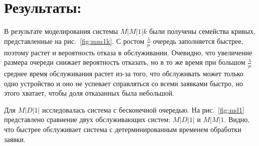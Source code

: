 \documentclass[a4paper,12 pt]{article}
\begin{document}
\section*{Результаты:}
В результате моделирования системы $M|M|1|k$ были получены семейства кривых, представленные на рис.~\ref{fig:mm1k}. С ростом $\frac{\lambda}{\mu}$ очередь заполняется быстрее, поэтому растет и вероятность отказа в обслуживании. Очевидно, что увеличение размера очереди снижает вероятность отказать, но в то же время при большом $\frac{\lambda}{\mu}$ среднее время обслуживания растет из-за того, что обслуживать может только одно устройство и оно не успевает справляться со всеми заявками быстро, но этого хватает, чтобы доля отказанных была небольшой.

Для $M|D|1|$ исследовалась система с бесконечной очередью. На рис.~\ref{fig:md1} представлено сравнение двух обслуживающих систем: $M|D|1|$ и $M|M|1$. Видно, что быстрее обслуживает система с детерминированным временем обработки заявки. 
\end{document}
